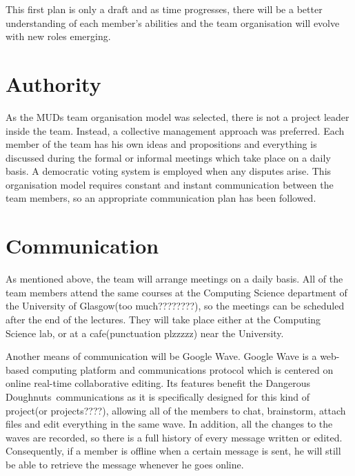 \documentclass{article}
\newcommand{\dnd}{Dangerous Doughnuts}
\begin{document}
This first plan is only a draft and as time progresses, there will be a better understanding of each member's abilities and the team organisation will evolve with new roles emerging. 


\section{Authority}
\label{auth}

As the MUDs team organisation model was selected, there is not a project leader inside the team. Instead, a collective management approach was preferred. Each member of the team has his own ideas and propositions and everything is discussed during the formal or informal meetings which take place on a daily basis. A democratic voting system is employed when any disputes arise. This organisation model requires constant and instant communication between the team members, so an appropriate communication plan has been followed.


\section{Communication}
\label{com}

As mentioned above, the team will arrange meetings on a daily basis. All of the team members attend the same courses at the Computing Science department of the University of Glasgow(too much????????), so the meetings can be scheduled after the end of the lectures. They will take place either at the Computing Science lab, or at a cafe(punctuation plzzzzz) near the University.

Another means of communication will be Google Wave. Google Wave is a web-based computing platform and communications protocol which is centered on online real-time collaborative editing. Its features benefit the \dnd\ communications as it is specifically designed for this kind of project(or projects????), allowing all of the members to chat, brainstorm, attach files and edit everything in the same wave. In addition, all the changes to the waves are recorded, so there is a full history of every message written or edited. Consequently, if a member is offline when a certain message is sent, he will still be able to retrieve the message whenever he goes online.
\end{document}
